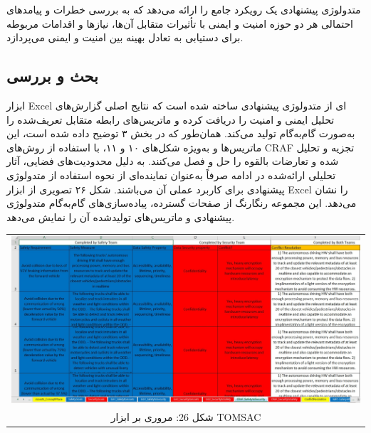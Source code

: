 \documentclass[a4paper,10pt]{article}
\begin{document}
            متدولوژی پیشنهادی یک رویکرد جامع را ارائه می‌دهد که به بررسی خطرات و پیامدهای احتمالی هر دو حوزه امنیت و ایمنی با تأثیرات متقابل آن‌ها، نیازها و اقدامات مربوطه برای دستیابی به تعادل بهینه بین امنیت و ایمنی می‌پردازد.

        \subsection{بحث و بررسی}
            
            ابزار Excel‌ ای از متدولوژی پیشنهادی ساخته شده است که نتایج اصلی گزارش‌های تحلیل ایمنی و امنیت را دریافت کرده و ماتریس‌های رابطه متقابل تعریف‌شده را به‌صورت گام‌به‌گام تولید می‌کند. همان‌طور که در بخش ۳ توضیح داده شده است، این ماتریس‌ها و به‌ویژه شکل‌های ۱۰ و ۱۱، با استفاده از روش‌های CRAF تجزیه و تحلیل شده و تعارضات بالقوه را حل و فصل می‌کنند. به دلیل محدودیت‌های فضایی، آثار تحلیلی ارائه‌شده در ادامه صرفاً به‌عنوان نماینده‌ای از نحوه استفاده از متدولوژی پیشنهادی برای کاربرد عملی آن می‌باشند. شکل ۲۶ تصویری از ابزار Excel را نشان می‌دهد. این مجموعه رنگارنگ از صفحات گسترده، پیاده‌سازی‌های گام‌به‌گام متدولوژی پیشنهادی و ماتریس‌های تولیدشده آن را نمایش می‌دهد.

            \begin{table}
            
                \centering
                \begin{tabular}{ c }
                    
                    \includegraphics[width=1\textwidth]{Image/fig26.jpg} \\

                    شکل 26: مروری بر ابزار TOMSAC

                \end{tabular}
    
            \end{table}
\end{document}
